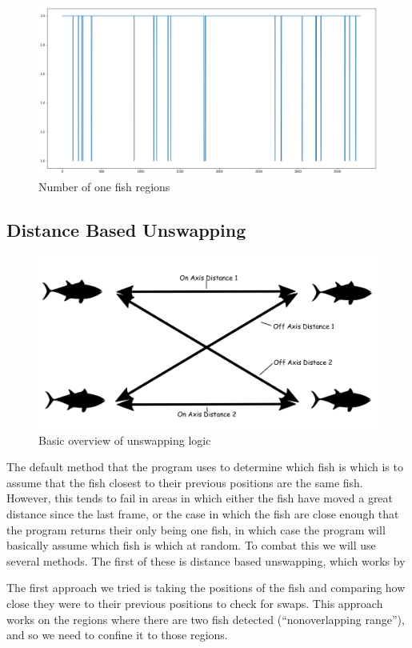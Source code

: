 \documentclass{article}
\begin{document}
\begin{figure}[H]
	\centering
	\includegraphics[width=.75\linewidth]{oneFish}
	\caption{Number of one fish regions}
\end{figure}


\subsection{Distance Based Unswapping}
\begin{figure}[H]
	\centering
	\includegraphics[width=.75\linewidth]{fish2}
	\caption{Basic overview of unswapping logic}
\end{figure}

The default method that the program uses to determine which fish is which is to assume that the fish closest to their previous positions are the same fish. However, this tends to fail in areas in which either the fish have moved a great distance since the last frame, or the case in which the fish are close enough that the program returns their only being one fish, in which case the program will basically assume which fish is which at random. To combat this we will use several methods. The first of these is distance based unswapping, which works by 

The first approach we tried is taking the positions of the fish and comparing how close they were to their previous positions to check for swaps. This approach works on the regions where there are two fish detected (``nonoverlapping range''), and so we need to confine it to those regions. 
\end{document}

